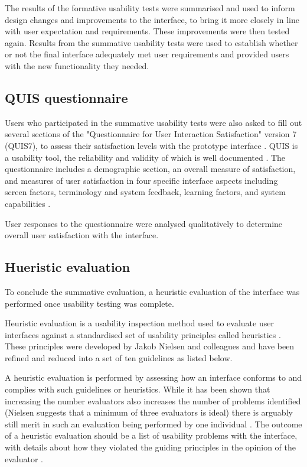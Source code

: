The results of the formative usability tests were summarised and used to inform design changes and improvements to the interface, to bring it more closely in line with user expectation and requirements. These improvements were then tested again. Results from the summative usability tests were used to establish whether or not the final interface adequately met user requirements and provided users with the new functionality they needed.

\subsection{QUIS questionnaire}
Users who participated in the summative usability tests were also asked to fill out several sections of the "Questionnaire for User Interaction Satisfaction" version 7 (QUIS7), to assess their satisfaction levels with the prototype interface \citep{QUIS}. QUIS is a usability tool, the reliability and validity of which is well documented \citep{Harper1997}. The questionnaire includes a demographic section, an overall measure of satisfaction, and measures of user satisfaction in four specific interface aspects including screen factors, terminology and system feedback, learning factors, and system capabilities \citep{Harper1993}.  

User responses to the questionnaire were analysed qualitatively to determine overall user satisfaction with the interface. 

\subsection{Hueristic evaluation}
To conclude the summative evaluation, a heuristic evaluation of the interface was performed once usability testing was complete. 

Heuristic evaluation is a usability inspection method used to evaluate user interfaces against a standardised set of usability principles called heuristics \citep[p. 506]{RogersPreece}. These principles were developed by Jakob Nielsen and colleagues \citep{NielsenMolich} and have been refined and reduced into a set of ten guidelines as listed below. 

A heuristic evaluation is performed by assessing how an interface conforms to and complies with such guidelines or heuristics. While it has been shown that increasing the number evaluators also increases the number of problems identified (Nielsen suggests that a minimum of three evaluators is ideal) there is arguably still merit in such an evaluation being performed by one individual \citep{NielsenHow}. The outcome of a heuristic evaluation should be a list of usability problems with the interface, with details about how they violated the guiding principles in the opinion of the evaluator \citep{NielsenHow}. 

